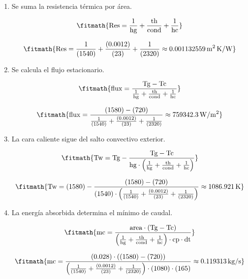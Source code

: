 \begin{enumerate}

\item Se suma la resistencia térmica por área.

\[\fitmath{\mathrm{Res}=\frac{1}{\mathrm{hg}}+\frac{\mathrm{th}}{\mathrm{cond}}+\frac{1}{\mathrm{hc}}}\]

\[\fitmath{\mathrm{Res}=\frac{1}{(1540)}+\frac{(0.0012)}{(23)}+\frac{1}{(2320)}\approx 0.001132559\,\mathrm{m^{2}\,K/W}}\]

\item Se calcula el flujo estacionario.

\[\fitmath{\mathrm{flux}=\frac{\mathrm{Tg}-\mathrm{Tc}}{\frac{1}{\mathrm{hg}}+\frac{\mathrm{th}}{\mathrm{cond}}+\frac{1}{\mathrm{hc}}}}\]

\[\fitmath{\mathrm{flux}=\frac{(1580)-(720)}{\frac{1}{(1540)}+\frac{(0.0012)}{(23)}+\frac{1}{(2320)}}\approx 759342.3\,\mathrm{W/m^{2}}}\]

\item La cara caliente sigue del salto convectivo exterior.

\[\fitmath{\mathrm{Tw}=\mathrm{Tg}-\frac{\mathrm{Tg}-\mathrm{Tc}}{\mathrm{hg}\cdot \left(\frac{1}{\mathrm{hg}}+\frac{\mathrm{th}}{\mathrm{cond}}+\frac{1}{\mathrm{hc}}\right)}}\]

\[\fitmath{\mathrm{Tw}=(1580)-\frac{(1580)-(720)}{(1540)\cdot \left(\frac{1}{(1540)}+\frac{(0.0012)}{(23)}+\frac{1}{(2320)}\right)}\approx 1086.921\,\mathrm{K}}\]

\item La energía absorbida determina el mínimo de caudal.

\[\fitmath{\mathrm{mc}=\frac{\mathrm{area}\cdot \left(\mathrm{Tg}-\mathrm{Tc}\right)}{\left(\frac{1}{\mathrm{hg}}+\frac{\mathrm{th}}{\mathrm{cond}}+\frac{1}{\mathrm{hc}}\right)\cdot \mathrm{cp}\cdot \mathrm{dt}}}\]

\[\fitmath{\mathrm{mc}=\frac{(0.028)\cdot \left((1580)-(720)\right)}{\left(\frac{1}{(1540)}+\frac{(0.0012)}{(23)}+\frac{1}{(2320)}\right)\cdot (1080)\cdot (165)}\approx 0.119313\,\mathrm{kg/s}}\]

\end{enumerate}
